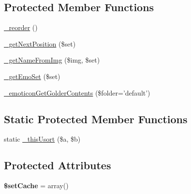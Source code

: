 \subsection*{Protected Member Functions}
\begin{DoxyCompactItemize}
\item 
\hyperlink{classadmin__core__posts__emoticons_af2dc694b733498d55f1d8dd9b27d0e17}{\-\_\-reorder} ()
\item 
\hyperlink{classadmin__core__posts__emoticons_aba725dab837bf841a2bc211943c430f0}{\-\_\-get\-Next\-Position} (\$set)
\item 
\hyperlink{classadmin__core__posts__emoticons_a3d7d3db895ce736b19aceea0bc147f7d}{\-\_\-get\-Name\-From\-Img} (\$img, \$set)
\item 
\hyperlink{classadmin__core__posts__emoticons_a50ece3271e043b73398e129ff22c2357}{\-\_\-get\-Emo\-Set} (\$set)
\item 
\hyperlink{classadmin__core__posts__emoticons_a0fb9d0dbede0a3baf40a7d33992298f8}{\-\_\-emoticon\-Get\-Golder\-Contents} (\$folder='default')
\end{DoxyCompactItemize}
\subsection*{Static Protected Member Functions}
\begin{DoxyCompactItemize}
\item 
static \hyperlink{classadmin__core__posts__emoticons_ab1192aa3289f02bfed172c3f3d9e9df8}{\-\_\-this\-Usort} (\$a, \$b)
\end{DoxyCompactItemize}
\subsection*{Protected Attributes}
\begin{DoxyCompactItemize}
\item 
\hypertarget{classadmin__core__posts__emoticons_ad79b9877f0c3cb76e478f148135fa63b}{{\bfseries \$set\-Cache} = array()}\label{classadmin__core__posts__emoticons_ad79b9877f0c3cb76e478f148135fa63b}

\end{DoxyCompactItemize}


